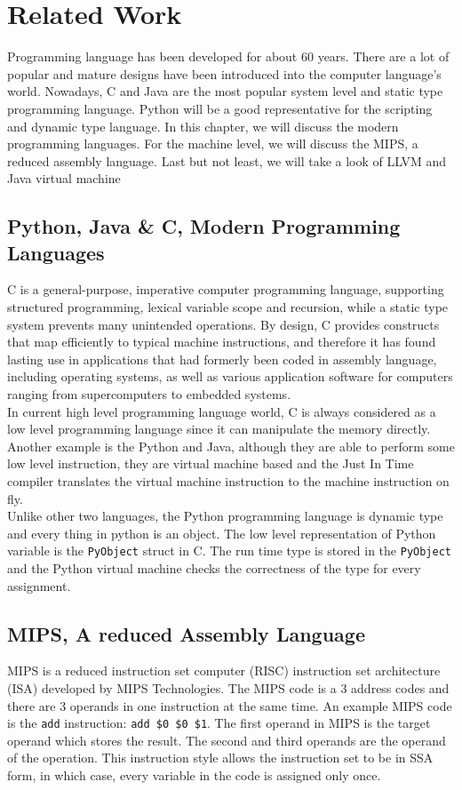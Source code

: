 \chapter{Related Work}
Programming language has been developed for about 60 years. There are a lot of popular and mature designs have been introduced into the computer language's world. Nowadays, C and Java are the most popular system level and static type programming language. Python will be a good representative for the scripting and dynamic type language. In this chapter, we will discuss the modern programming languages. For the machine level, we will discuss the MIPS, a reduced assembly language. Last but not least, we will take a look of LLVM and Java virtual machine

\section{Python, Java \& C, Modern Programming Languages}
C is a general-purpose, imperative computer programming language, supporting structured programming, lexical variable scope and recursion, while a static type system prevents many unintended operations. By design, C provides constructs that map efficiently to typical machine instructions, and therefore it has found lasting use in applications that had formerly been coded in assembly language, including operating systems, as well as various application software for computers ranging from supercomputers to embedded systems. \\
In current high level programming language world, C is always considered as a low level programming language since it can manipulate the memory directly. Another example is the Python and Java, although they are able to perform some low level instruction, they are virtual machine based and the Just In Time compiler translates the virtual machine instruction to the machine instruction on fly. \\
Unlike other two languages, the Python programming language is dynamic type and every thing in python is an object. The low level representation of Python variable is the \texttt{PyObject} struct in C. The run time type is stored in the \texttt{PyObject} and the Python virtual machine checks the correctness of the type for every assignment.

\section{MIPS, A reduced Assembly Language}
MIPS is a reduced instruction set computer (RISC) instruction set architecture (ISA) developed by MIPS Technologies. The MIPS code is a 3 address codes and there are 3 operands in one instruction at the same time. An example MIPS code is the \texttt{add} instruction: \texttt{add \$0 \$0 \$1}. The first operand in MIPS is the target operand which stores the result. The second and third operands are the operand of the operation. This instruction style allows the instruction set to be in SSA form, in which case, every variable in the code is assigned only once.


